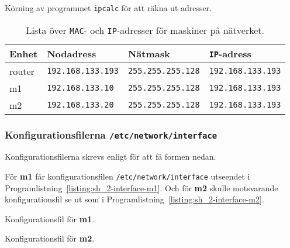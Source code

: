 \begin{listing}[H]
  \caption{Körning av programmet \texttt{ipcalc} för att räkna ut adresser.}
  \label{listing:sh_2-ipcalc}
\end{listing}


\begin{table}[]
  \centering
  \caption{Lista över \texttt{MAC}- och \texttt{IP}-adresser för maskiner på
           nätverket.}
  \label{table:interface-config}
  \begin{tabular}{@{}llll@{}}
    \toprule
    Enhet  & Nodadress                & Nätmask                  & \texttt{IP}-adress       \\ \midrule
    router & \texttt{192.168.133.193} & \texttt{255.255.255.128} & \texttt{192.168.133.193} \\
    m1     & \texttt{192.168.133.10}  & \texttt{255.255.255.128} & \texttt{192.168.133.193} \\
    m2     & \texttt{192.168.133.20}  & \texttt{255.255.255.128} & \texttt{192.168.133.193} \\ \bottomrule
  \end{tabular}
\end{table}


\subsubsection{Konfigurationsfilerna \texttt{/etc/network/interface}}
Konfigurationsfilerna skrevs enligt \cite{debian:network} för att få formen
nedan.

För \textbf{m1} får konfigurationsfilen \texttt{/etc/network/interface}
utseendet i Programlistning~\ref{listing:sh_2-interface-m1}.  Och för
\textbf{m2} skulle motsvarande konfigurationsfil se ut som i
Programlistning~\ref{listing:sh_2-interface-m2}.


\begin{listing}[H]
  \caption{Konfigurationsfil för \textbf{m1}.}
  \label{listing:sh_2-interface-m1}
\end{listing}

\begin{listing}[H]
  \caption{Konfigurationsfil för \textbf{m2}.}
  \label{listing:sh_2-interface-m2}
\end{listing}
